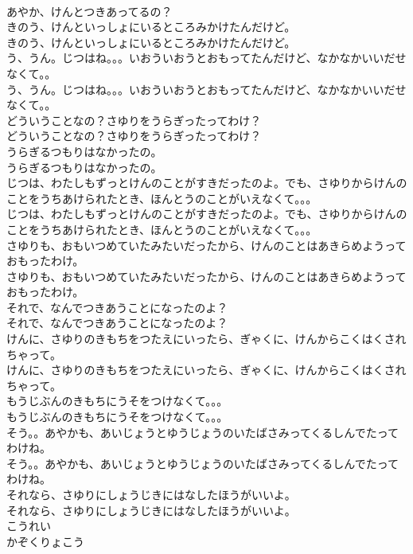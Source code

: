 \documentclass[8pt]{extreport}
\begin{document}
\begin{CJK}{UTF8}{min}
\\	あやか、けんとつきあってるの？ 
\\	きのう、けんといっしょにいるところみかけたんだけど。	
\\	きのう、けんといっしょにいるところみかけたんだけど。 
\\	う、うん。じつはね。。。いおういおうとおもってたんだけど、なかなかいいだせなくて。。	
\\	う、うん。じつはね。。。いおういおうとおもってたんだけど、なかなかいいだせなくて。。 
\\	どういうことなの？さゆりをうらぎったってわけ？	
\\	どういうことなの？さゆりをうらぎったってわけ？ 
\\	うらぎるつもりはなかったの。	
\\	うらぎるつもりはなかったの。 
\\	じつは、わたしもずっとけんのことがすきだったのよ。でも、さゆりからけんのことをうちあけられたとき、ほんとうのことがいえなくて。。。	
\\	じつは、わたしもずっとけんのことがすきだったのよ。でも、さゆりからけんのことをうちあけられたとき、ほんとうのことがいえなくて。。。 
\\	さゆりも、おもいつめていたみたいだったから、けんのことはあきらめようっておもったわけ。	
\\	さゆりも、おもいつめていたみたいだったから、けんのことはあきらめようっておもったわけ。 
\\	それで、なんでつきあうことになったのよ？	
\\	それで、なんでつきあうことになったのよ？ 
\\	けんに、さゆりのきもちをつたえにいったら、ぎゃくに、けんからこくはくされちゃって。	
\\	けんに、さゆりのきもちをつたえにいったら、ぎゃくに、けんからこくはくされちゃって。 
\\	もうじぶんのきもちにうそをつけなくて。。。	
\\	もうじぶんのきもちにうそをつけなくて。。。 
\\	そう。。あやかも、あいじょうとゆうじょうのいたばさみってくるしんでたってわけね。	
\\	そう。。あやかも、あいじょうとゆうじょうのいたばさみってくるしんでたってわけね。 
\\	それなら、さゆりにしょうじきにはなしたほうがいいよ。	
\\	それなら、さゆりにしょうじきにはなしたほうがいいよ。 
\\	こうれい
\\	かぞくりょこう

\end{CJK}
\end{document}
